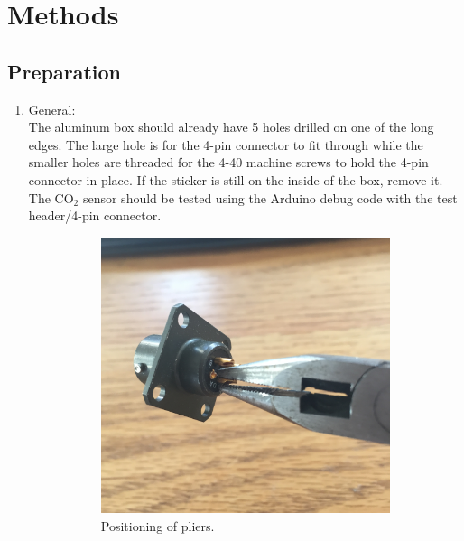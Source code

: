 \documentclass[letterpaper,12pt]{article}
\begin{document}



\section{Methods}
\subsection{Preparation}
	\begin{enumerate}
		\item General: \\
		\textnormal{The aluminum box should already have 5 holes drilled on one of the long edges. The large hole is for the 4-pin connector to fit through while the smaller holes are threaded for the 4-40 machine screws to hold the 4-pin connector in place. If the sticker is still on the inside of the box, remove it. The CO$_2$ sensor should be tested using the Arduino debug code with the test header/4-pin connector.}		
		\begin{figure}
			\centering
			\begin{subfigure}{.45\textwidth}
  				\centering
				\includegraphics[width=\linewidth]{4pin_pliers.png}
				\caption{Positioning of pliers.}
				\label{fig:4pin_pliers}
			\end{subfigure}
			\begin{subfigure}{.45\textwidth}

\end{subfigure}
\end{figure}
\end{enumerate}
\end{document}
